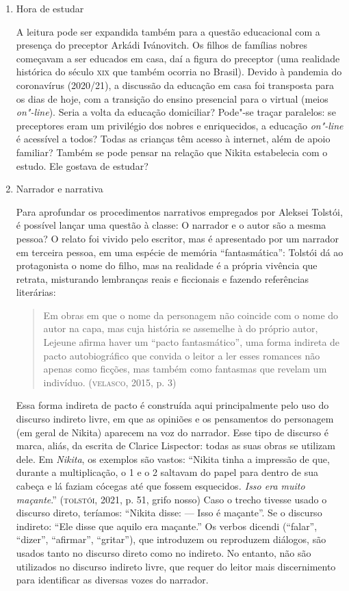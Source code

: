 \documentclass[11pt]{extarticle}
\begin{document}
\begin{enumerate}
\item
Hora de estudar

A leitura pode ser expandida também para a questão educacional com a
presença do preceptor Arkádi Ivánovitch. Os filhos de famílias nobres
começavam a ser educados em casa, daí a figura do preceptor (uma
realidade histórica do século \textsc{xix} que também ocorria no Brasil). Devido
à pandemia do coronavírus (2020/21), a discussão da educação em casa foi
transposta para os dias de hoje, com a transição do ensino presencial
para o virtual (meios \emph{on"-line}). Seria a volta da educação
domiciliar? Pode"-se traçar paralelos: se preceptores eram um privilégio
dos nobres e enriquecidos, a educação \emph{on"-line} é acessível a
todos? Todas as crianças têm acesso à internet, além de apoio familiar?
Também se pode pensar na relação que Nikita estabelecia com o estudo.
Ele gostava de estudar?

\item
Narrador e narrativa

Para aprofundar os procedimentos narrativos empregados por Aleksei
Tolstói, é possível lançar uma questão à classe: O narrador e o autor
são a mesma pessoa? O relato foi vivido pelo escritor, mas é apresentado
por um narrador em terceira pessoa, em uma espécie de memória
``fantasmática'': Tolstói dá ao protagonista o nome do filho, mas na
realidade é a própria vivência que retrata, misturando lembranças reais
e ficcionais e fazendo referências literárias:

\begin{quote}
Em obras em que o nome da personagem não coincide com o nome do autor na
capa, mas cuja história se assemelhe à do próprio autor, Lejeune afirma
haver um ``pacto fantasmático'', uma forma indireta de pacto
autobiográfico que convida o leitor a ler esses romances não apenas como
ficções, mas também como fantasmas que revelam um indivíduo.
(\textsc{velasco}, 2015, p. 3)
\end{quote}

Essa forma indireta de pacto é construída aqui principalmente pelo uso
do discurso indireto livre, em que as opiniões e os pensamentos do
personagem (em geral de Nikita) aparecem na voz do narrador. Esse tipo
de discurso é marca, aliás, da escrita de Clarice Lispector: todas as
suas obras se utilizam dele. Em \emph{Nikita}, os exemplos são vastos:
``Nikita tinha a impressão de que, durante a multiplicação, o 1 e o 2
saltavam do papel para dentro de sua cabeça e lá faziam cócegas até que
fossem esquecidos\emph{. Isso era muito maçante}.'' (\textsc{tolstói}, 2021, p.
51, grifo nosso) Caso o trecho tivesse usado o discurso direto,
teríamos: ``Nikita disse: --- Isso é maçante''. Se o discurso indireto:
``Ele disse que aquilo era maçante.'' Os verbos dicendi (``falar'',
``dizer'', ``afirmar'', ``gritar''), que introduzem ou reproduzem
diálogos, são usados tanto no discurso direto como no indireto. No entanto, 
não são utilizados no discurso indireto livre, que requer do leitor mais
discernimento para identificar as diversas vozes do narrador.


\end{enumerate}
\end{document}
